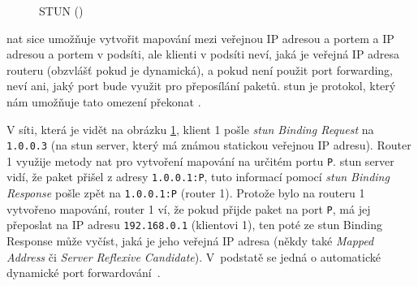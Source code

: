 \begin{figure}[H]
    \centering
    \caption{STUN (\publicPrivateIP)}
    \label{stunFig}
\end{figure}

\gls{nat} sice umožňuje vytvořit mapování mezi veřejnou IP adresou a portem a IP
adresou a portem v podsíti, ale klienti v podsíti neví, jaká je veřejná IP
adresa routeru (obzvlášť pokud je dynamická), a pokud není použit port
forwarding, neví ani, jaký port bude využit pro přeposílání paketů. \gls{stun}
je protokol, který nám umožňuje tato omezení překonat
\parencite{WebRTCForTheCurious}.

V síti, která je vidět na obrázku \ref{stunFig}, klient 1 pošle
\textit{\gls{stun} Binding Request} na \texttt{1.0.0.3} (na
\gls{stun} server, který má známou statickou veřejnou IP adresu). Router 1
využije metody \gls{nat} pro vytvoření mapování na určitém portu
\texttt{P}. \gls{stun} server vidí, že paket přišel z adresy
\texttt{1.0.0.1:P}, tuto informací pomocí \textit{\gls{stun}
    Binding Response} pošle zpět na \texttt{1.0.0.1:P} (router 1).
Protože bylo na routeru 1 vytvořeno mapování, router 1 ví, že pokud přijde
paket na port \texttt{P}, má jej přeposlat na IP adresu
\texttt{192.168.0.1} (klientovi 1), ten poté ze \gls{stun} Binding
Response může vyčíst, jaká je jeho veřejná IP adresa (někdy také
\textit{Mapped Address} či \textit{Server Reflexive Candidate}). V~podstatě
se jedná o automatické dynamické port
forwardování~\parencite{WebRTCForTheCurious}.

